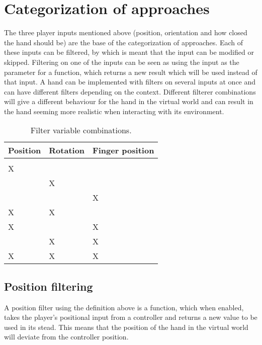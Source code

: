 \section{Categorization of approaches}
\label{sec:categorizationOfApproaches}
The three player inputs mentioned above (position, orientation and how closed the hand should be) are the base of the categorization of approaches. Each of these inputs can be filtered, by which is meant that the input can be modified or skipped. Filtering on one of the inputs can be seen as using the input as the parameter for a function, which returns a new result which will be used instead of that input. A hand can be implemented with filters on several inputs at once and can have different filters depending on the context. Different filterer combinations will give a different behaviour for the hand in the virtual world and can result in the hand seeming more realistic when interacting with its environment.

\begin{table}[H]
\centering
\caption{Filter variable combinations.}
\label{tab:filterVariableCombinations}
\begin{tabular}{C{2cm}C{2cm}C{2cm}}
Position & Rotation & Finger position \\ \midrule \midrule
				&					&					\\ \midrule
\Large X	&					&					\\ \midrule
				& \Large X	& 		                \\ \midrule
				&					& \Large X     \\ \midrule
\Large X	& \Large X	&					\\ \midrule
\Large X 	&					& \Large X	\\ \midrule
				& \Large X	& \Large X	\\ \midrule
\Large X 	& \Large X 	& \Large X
\end{tabular}
\end{table}

\subsection{Position filtering}
\label{subsec:categoryPositionFiltering}
A position filter using the definition above is a function, which when enabled, takes the player's positional input from a controller and returns a new value to be used in its stead. This means that the position of the hand in the virtual world will deviate from the controller position.\\

